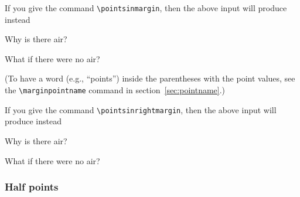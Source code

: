 \documentclass[12pt]{exam}
\begin{document}
\bigskip
If you give the command \verb"\pointsinmargin", then the above input
will produce instead
\pointsinmargin
\begin{questions}
\question[20]
Why is there air?


\question
What if there were no air?


\end{questions}
(To have a word (e.g., ``points'') inside the parentheses with the
point values, see the \verb"\marginpointname" command in
section~\ref{sec:pointname}.)


\bigskip 

If you give the command \verb"\pointsinrightmargin", then the above
input will produce instead
\pointsinrightmargin
\begin{questions}
\question[20]
Why is there air?


\question
What if there were no air?


\end{questions}

\subsubsection{Half points}
\label{sec:Half}
\end{document}
